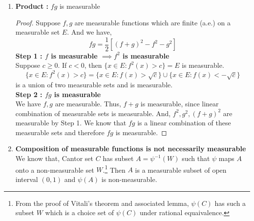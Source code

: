 \begin{enumerate}
\begin{proof}
		\textbf{Step 2 : $f,g$ are measurable $\implies f+g$ is measurable}\\
		\begin{align*}
			f(x)+g(x) < c \iff & f(x) <  c - g(x) 
			\intertext{Since $\mathbb{Q}$ is dense, there exists a rational number $q \in \mathbb{Q}$ between any two distinct real numbers}
                        f(x) + g(x) < c\iff & \exists q \in \mathbb{Q},\ f(x) < q < c-g(x) \\
			\iff & f(x) < q \text{ AND } g(x) < c-q
		\end{align*}
		\begin{align*}
			\{ x \in E : f+g(x) < c \} = & \{ x \in E : f(x) + g(x) < c \} \\
			= & \bigcup_{q \in \mathbb{Q}} \left[ \{ x \in E : f(x) < c \} \cap \{ x \in E : g(x) < c - q \} \right]
		\end{align*}
		Since, $f,g$ are measurable, each set in the union is measurable.
		Thus, $\{ x \in E : f+g(x) < c\}$ is measurable for every $c \in \mathbb{R}$, since rational numbers are countable, and countable union of measurable sets is measurable.
		Therefore, $f+g$ is measurable.
	\end{proof}
\item \textbf{ Product : }$fg$ is measurable
	\begin{proof}
		Suppose $f,g$ are measurable functions which are finite (a.e.) on a measurable set $E$.
		And we have,
		\begin{equation}
			fg = \frac{1}{2} \left[ (f+g)^2 - f^2 - g^2 \right]
		\end{equation}
		\textbf{Step 1 : $f$ is measurable $\implies f^2$ is measurable}\\
		Suppose $c \ge 0$.
		If $c < 0$, then $\{ x \in E : f^2(x) > c \} = E$ is measurable.
		\begin{equation*}
			\{ x \in E : f^2(x) > c \} = \{ x \in E : f(x) > \sqrt{c} \} \cup \{ x \in E : f(x) < -\sqrt{c} \}
		\end{equation*}
		is a union of two measurable sets and is measurable.\\

		\textbf{Step 2 : $fg$ is measurable} \\
		We have $f,g$ are measurable.
		Thus, $f+g$ is measurable, since linear combination of measurable sets is measurable.
		And, $f^2,g^2,(f+g)^2$ are measurable by Step 1.
		We know that $fg$ is a linear combination of these measurable sets and therefore $fg$ is measurable.
	\end{proof}
\item \textbf{Composition of measurable functions is not necessarily measurable}\\
	We know that, Cantor set $C$ has subset $A = \psi^{-1}(W)$ such that $\psi$ maps $A$ onto a non-measurable set $W$.\dag\footnote{
		From the proof of Vitali's theorem and associated lemma, $\psi(C)$ has such a subset $W$ which is a choice set of $\psi(C)$ under rational equaivalence.}
	Then $A$ is a measurable subset of open interval $(0,1)$ and $\psi(A)$ is non-measurable.\\
		

\end{enumerate}
